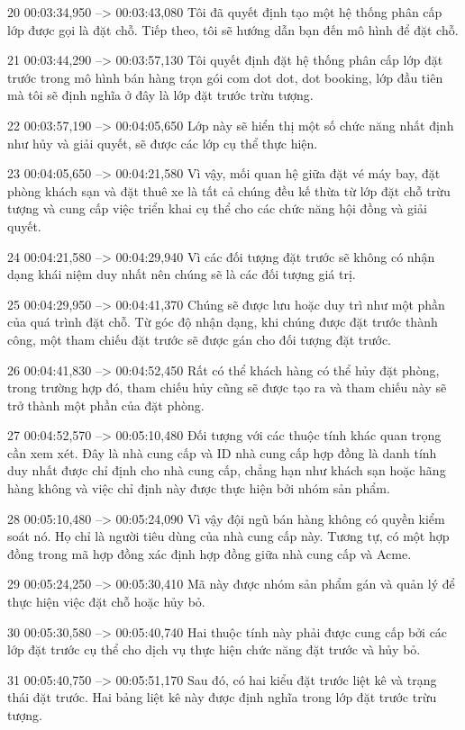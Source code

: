 20
00:03:34,950 --> 00:03:43,080
Tôi đã quyết định tạo một hệ thống phân cấp lớp được gọi là đặt chỗ.  Tiếp theo, tôi sẽ hướng dẫn bạn đến mô hình để đặt chỗ.

21
00:03:44,290 --> 00:03:57,130
Tôi quyết định đặt hệ thống phân cấp lớp đặt trước trong mô hình bán hàng trọn gói com dot dot, dot booking, lớp đầu tiên mà tôi sẽ định nghĩa ở đây là lớp đặt trước trừu tượng.

22
00:03:57,190 --> 00:04:05,650
Lớp này sẽ hiển thị một số chức năng nhất định như hủy và giải quyết, sẽ được các lớp cụ thể thực hiện.

23
00:04:05,650 --> 00:04:21,580
Vì vậy, mối quan hệ giữa đặt vé máy bay, đặt phòng khách sạn và đặt thuê xe là tất cả chúng đều kế thừa từ lớp đặt chỗ trừu tượng và cung cấp việc triển khai cụ thể cho các chức năng hội đồng và giải quyết.

24
00:04:21,580 --> 00:04:29,940
Vì các đối tượng đặt trước sẽ không có nhận dạng khái niệm duy nhất nên chúng sẽ là các đối tượng giá trị.

25
00:04:29,950 --> 00:04:41,370
Chúng sẽ được lưu hoặc duy trì như một phần của quá trình đặt chỗ.  Từ góc độ nhận dạng, khi chúng được đặt trước thành công, một tham chiếu đặt trước sẽ được gán cho đối tượng đặt trước.

26
00:04:41,830 --> 00:04:52,450
Rất có thể khách hàng có thể hủy đặt phòng, trong trường hợp đó, tham chiếu hủy cũng sẽ được tạo ra và tham chiếu này sẽ trở thành một phần của đặt phòng.

27
00:04:52,570 --> 00:05:10,480
Đối tượng với các thuộc tính khác quan trọng cần xem xét.  Đây là nhà cung cấp và ID nhà cung cấp hợp đồng là danh tính duy nhất được chỉ định cho nhà cung cấp, chẳng hạn như khách sạn hoặc hãng hàng không và việc chỉ định này được thực hiện bởi nhóm sản phẩm.

28
00:05:10,480 --> 00:05:24,090
Vì vậy đội ngũ bán hàng không có quyền kiểm soát nó.  Họ chỉ là người tiêu dùng của nhà cung cấp này.  Tương tự, có một hợp đồng trong mã hợp đồng xác định hợp đồng giữa nhà cung cấp và Acme.

29
00:05:24,250 --> 00:05:30,410
Mã này được nhóm sản phẩm gán và quản lý để thực hiện việc đặt chỗ hoặc hủy bỏ.

30
00:05:30,580 --> 00:05:40,740
Hai thuộc tính này phải được cung cấp bởi các lớp đặt trước cụ thể cho dịch vụ thực hiện chức năng đặt trước và hủy bỏ.

31
00:05:40,750 --> 00:05:51,170
Sau đó, có hai kiểu đặt trước liệt kê và trạng thái đặt trước.  Hai bảng liệt kê này được định nghĩa trong lớp đặt trước trừu tượng.

